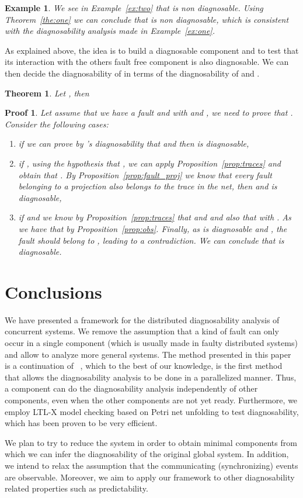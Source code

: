 \documentclass[a4paper]{article}
\newtheorem{exmp}{Example}
\newtheorem{thm}{Theorem}
\newtheorem{pf}{Proof}
\begin{document}
\begin{exmp}
  We see in Example~\ref{ex:two} that  is non diagnosable. Using Theorem~\ref{the:one} we can conclude that  is non diagnosable, which is consistent with the diagnosability analysis made in Example~\ref{ex:one}.
\end{exmp}

As explained above, the idea is to build a diagnosable component and to test that its interaction with the others fault free component is also diagnosable. We can then decide the diagnosability of  in terms of the diagnosability of  and .

\begin{thm}
  Let , then 
\end{thm}


\begin{pf}
  Let assume that we have a fault  and  with  and , we need to prove that . Consider the following cases: 
  \begin{enumerate}
    \item if  we can prove by 's diagnosability that  and then  is diagnosable,
    \item if , using the hypothesis that , we can apply Proposition~\ref{prop:traces} and obtain that . By Proposition~\ref{prop:fault_proj} we know that every fault belonging to a projection also belongs to the trace in the net, then  and  is diagnosable,
    \item if  and  we know by Proposition~\ref{prop:traces} that  and  and also that  with . As  we have that  by Proposition~\ref{prop:obs}. Finally, as  is diagnosable and , the fault should belong to , leading to a contradiction. We can conclude that  is diagnosable.
  \end{enumerate}
\end{pf}

\section{Conclusions} \label{sec:CFW}

We have presented a framework for the distributed diagnosability analysis of concurrent systems. We remove the assumption that a kind of fault can only occur in a single component (which is usually made in faulty distributed systems) and allow to analyze more general systems. The method presented in this paper is a continuation of ~\cite{par_diag}, which to the best of our knowledge, is the first method that allows the diagnosability analysis to be done in a parallelized manner. Thus, a component can do the diagnosability analysis independently of other components, even when the other components are not yet ready. Furthermore, we employ LTL-X model checking based on Petri net unfolding to test diagnosability, which has been proven to be very efficient.

We plan to try to reduce the system in order to obtain minimal components from which we can infer the diagnosability of the original global system. In addition, we intend to relax the assumption that the communicating (synchronizing) events are observable. Moreover, we aim to apply our framework to other diagnosability related properties such as predictability.



\end{document}
